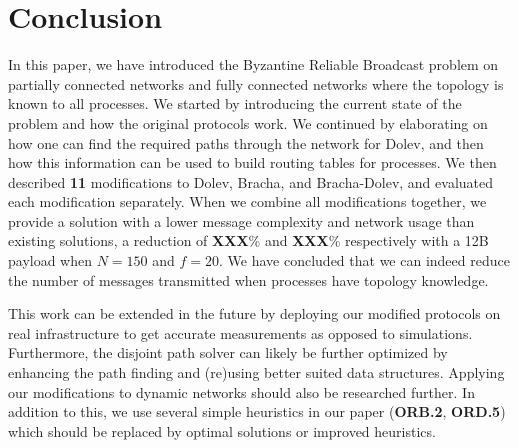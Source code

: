 \section{Conclusion}
\label{conclusion}


In this paper, we have introduced the Byzantine Reliable Broadcast problem on partially connected networks and fully connected networks where the topology is known to all processes. We started by introducing the current state of the problem and how the original protocols work. We continued by elaborating on how one can find the required paths through the network for Dolev, and then how this information can be used to build routing tables for processes. We then described \textbf{11} modifications to Dolev, Bracha, and Bracha-Dolev, and evaluated each modification separately. When we combine all modifications together, we provide a solution with a lower message complexity and network usage than existing solutions, a reduction of \textbf{XXX}\% and \textbf{XXX}\% respectively with a 12B payload when $N=150$ and $f=20$.
We have concluded that we can indeed reduce the number of messages transmitted when processes have topology knowledge.

This work can be extended in the future by deploying our modified protocols on real infrastructure to get accurate measurements as opposed to simulations. Furthermore, the disjoint path solver can likely be further optimized by enhancing the path finding and (re)using better suited data structures. Applying our modifications to dynamic networks should also be researched further. In addition to this, we use several simple heuristics in our paper (\textbf{ORB.2}, \textbf{ORD.5}) which should be replaced by optimal solutions or improved heuristics.


